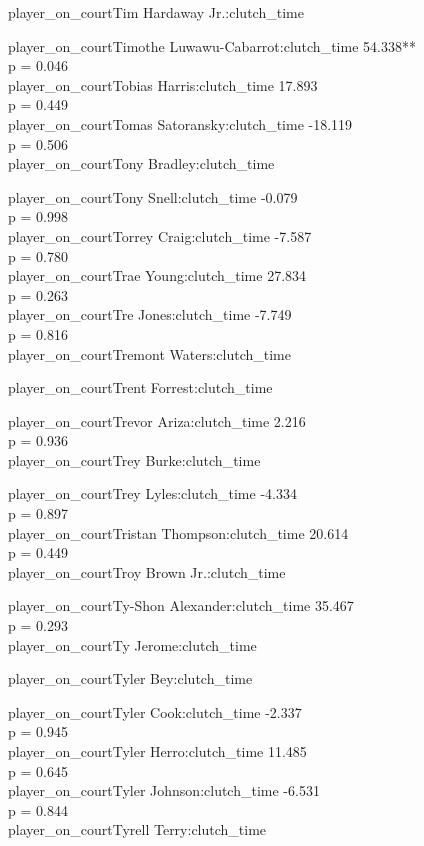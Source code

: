 \documentclass[
  landscape]{article}
\begin{document}
player\_on\_courtTim Hardaway Jr.:clutch\_time

player\_on\_courtTimothe Luwawu-Cabarrot:clutch\_time 54.338**\\
p = 0.046\\
player\_on\_courtTobias Harris:clutch\_time 17.893\\
p = 0.449\\
player\_on\_courtTomas Satoransky:clutch\_time -18.119\\
p = 0.506\\
player\_on\_courtTony Bradley:clutch\_time

player\_on\_courtTony Snell:clutch\_time -0.079\\
p = 0.998\\
player\_on\_courtTorrey Craig:clutch\_time -7.587\\
p = 0.780\\
player\_on\_courtTrae Young:clutch\_time 27.834\\
p = 0.263\\
player\_on\_courtTre Jones:clutch\_time -7.749\\
p = 0.816\\
player\_on\_courtTremont Waters:clutch\_time

player\_on\_courtTrent Forrest:clutch\_time

player\_on\_courtTrevor Ariza:clutch\_time 2.216\\
p = 0.936\\
player\_on\_courtTrey Burke:clutch\_time

player\_on\_courtTrey Lyles:clutch\_time -4.334\\
p = 0.897\\
player\_on\_courtTristan Thompson:clutch\_time 20.614\\
p = 0.449\\
player\_on\_courtTroy Brown Jr.:clutch\_time

player\_on\_courtTy-Shon Alexander:clutch\_time 35.467\\
p = 0.293\\
player\_on\_courtTy Jerome:clutch\_time

player\_on\_courtTyler Bey:clutch\_time

player\_on\_courtTyler Cook:clutch\_time -2.337\\
p = 0.945\\
player\_on\_courtTyler Herro:clutch\_time 11.485\\
p = 0.645\\
player\_on\_courtTyler Johnson:clutch\_time -6.531\\
p = 0.844\\
player\_on\_courtTyrell Terry:clutch\_time
\end{document}
